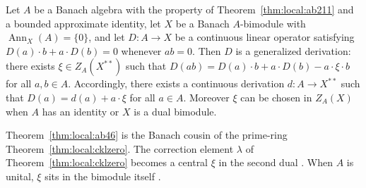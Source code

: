 \begin{theorem}\label{thm:local:ab46}
Let $A$ be a Banach algebra with the property of
Theorem~\ref{thm:local:ab211} and a bounded approximate identity, let $X$
be a Banach $A$-bimodule with $\operatorname{Ann}_X(A)=\{0\}$, and let
$D\colon A\to X$ be a continuous linear operator satisfying
$D(a)\cdot b+a\cdot D(b)=0$ whenever $ab=0$. Then $D$ is a generalized
derivation: there exists $\xi\in Z_A(X^{**})$ such that
$D(ab)=D(a)\cdot b+a\cdot D(b)-a\cdot\xi\cdot b$ for all $a,b\in A$.
Accordingly, there exists a continuous derivation $d\colon A\to X^{**}$
such that $D(a)=d(a)+a\cdot\xi$ for all $a\in A$. Moreover $\xi$ can be
chosen in $Z_A(X)$ when $A$ has an identity or $X$ is a dual bimodule.
\end{theorem}

Theorem~\ref{thm:local:ab46} is the Banach cousin of the prime-ring
Theorem~\ref{thm:local:cklzero}. The correction element $\lambda$ of
Theorem~\ref{thm:local:cklzero} becomes a central $\xi$ in the second dual
\cite[p.~156]{AlaminosBresar2009}. When $A$ is
unital, $\xi$ sits in the bimodule itself
\cite[p.~156]{AlaminosBresar2009}.

